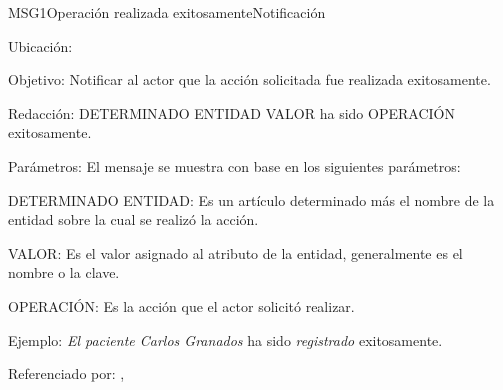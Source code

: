 \begin{mensaje}{MSG1}{Operación realizada exitosamente}{Notificación}
    \item[Ubicación:] \msjSuperior
    \item[Objetivo:] Notificar al actor que la acción solicitada fue realizada exitosamente.
    \item[Redacción:] DETERMINADO ENTIDAD VALOR ha sido OPERACIÓN exitosamente.
    \item[Parámetros:] El mensaje se muestra con base en los siguientes parámetros:
    \begin{Citemize}
	\item DETERMINADO ENTIDAD: Es un artículo determinado más el nombre de la entidad sobre la cual se realizó la acción.
	\item VALOR: Es el valor asignado al atributo de la entidad, generalmente es el nombre o la clave.
	\item OPERACIÓN: Es la acción que el actor solicitó realizar.
    \end{Citemize}
    \item[Ejemplo:] {\em El paciente Carlos Granados} ha sido {\em registrado} exitosamente.
    \item[Referenciado por:] , 
\end{mensaje}

